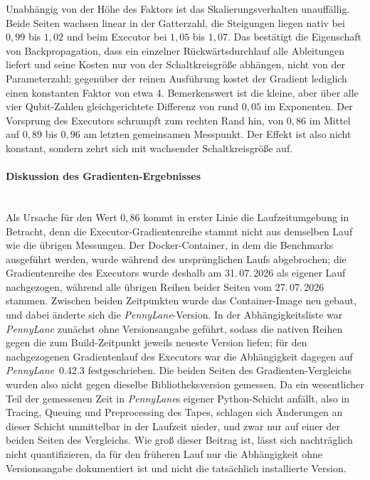 Unabhängig von der Höhe des Faktors ist das Skalierungsverhalten unauffällig.
Beide Seiten wachsen linear in der Gatterzahl, die Steigungen liegen nativ bei
$0{,}99$ bis $1{,}02$ und beim Executor bei $1{,}05$ bis $1{,}07$. Das
bestätigt die Eigenschaft von Backpropagation, dass ein einzelner
Rückwärtsdurchlauf alle Ableitungen liefert und seine Kosten nur von der
Schaltkreisgröße abhängen, nicht von der Parameterzahl; gegenüber der reinen
Ausführung kostet der Gradient lediglich einen konstanten Faktor von etwa 4.
Bemerkenswert ist die kleine, aber über alle vier Qubit-Zahlen gleichgerichtete
Differenz von rund $0{,}05$ im Exponenten. Der Vorsprung des Executors schrumpft
zum rechten Rand hin, von $0{,}86$ im Mittel auf $0{,}89$ bis $0{,}96$ am
letzten gemeinsamen Messpunkt. Der Effekt ist also nicht konstant, sondern
zehrt sich mit wachsender Schaltkreisgröße auf.

\paragraph*{Diskussion des Gradienten-Ergebnisses}\mbox{}\\
Als Ursache für den Wert $0{,}86$ kommt in erster Linie die Laufzeitumgebung in
Betracht, denn die Executor-Gradientenreihe stammt nicht aus demselben Lauf wie
die übrigen Messungen. Der Docker-Container, in dem die Benchmarks ausgeführt
werden, wurde während des ursprünglichen Laufs abgebrochen; die Gradientenreihe
des Executors wurde deshalb am 31.\,07.\,2026 als eigener Lauf nachgezogen,
während alle übrigen Reihen beider Seiten vom 27.\,07.\,2026 stammen. Zwischen
beiden Zeitpunkten wurde das Container-Image neu gebaut, und dabei änderte sich
die \textit{PennyLane}-Version. In der Abhängigkeitsliste war \textit{PennyLane}
zunächst ohne Versionsangabe geführt, sodass die nativen Reihen gegen die zum
Build-Zeitpunkt jeweils neueste Version liefen; für den nachgezogenen
Gradientenlauf des Executors war die Abhängigkeit dagegen auf
\textit{PennyLane}~0.42.3 festgeschrieben. Die beiden Seiten des
Gradienten-Vergleichs wurden also nicht gegen dieselbe Bibliotheksversion
gemessen. Da ein wesentlicher Teil der gemessenen Zeit in \textit{PennyLane}s
eigener Python-Schicht anfällt, also in Tracing, Queuing und Preprocessing des
Tapes, schlagen sich Änderungen an dieser Schicht unmittelbar in der Laufzeit
nieder, und zwar nur auf einer der beiden Seiten des Vergleichs. Wie groß dieser
Beitrag ist, lässt sich nachträglich nicht quantifizieren, da für den früheren
Lauf nur die Abhängigkeit ohne Versionsangabe dokumentiert ist und nicht die
tatsächlich installierte Version.

